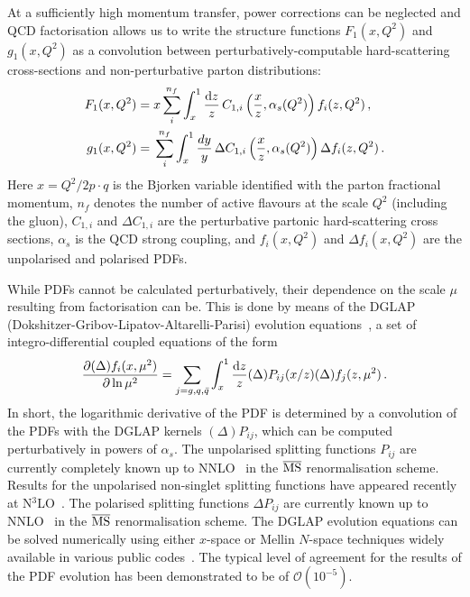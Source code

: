 At a sufficiently high momentum transfer, power corrections can be neglected and
QCD factorisation allows us to write the structure functions 
$F_1(x,Q^2)$ and $g_1(x,Q^2)$ as a convolution between perturbatively-computable
hard-scattering cross-sections and non-perturbative parton distributions:
\begin{align}
F_1(x,Q^2) 
= {} 
& x\sum_i^{n_f} \int_x^1 \frac{{\rm d}z}{z}\,C_{1,i}\left(\frac{x}{z},\alpha_s(Q^2)\right)f_i(z,Q^2) \,, \label{eq:Fi}\\
g_1(x,Q^2) 
= {} 
& \sum_i^{n_f} \int_x^1\frac{dy}{y}\, \Delta C_{1,i}\left(\frac{x}{z},\alpha_s(Q^2)\right) \Delta f_i(z,Q^2) \,.
\label{pdf}
\end{align}
%
Here $x=Q^2/2p\cdot q$ is the Bjorken variable identified with the parton
fractional momentum, $n_f$ denotes the number of active
flavours at the scale $Q^2$ (including the gluon), $C_{1,i}$ and 
$\Delta C_{1,i}$ are the perturbative partonic hard-scattering cross sections,
$\alpha_s$ is the QCD strong coupling, and $f_i(x,Q^2)$ and $\Delta f_i(x,Q^2)$ 
are the unpolarised and polarised PDFs.

While PDFs cannot be calculated perturbatively, their dependence on the scale 
$\mu$ resulting from factorisation can be.
%
This is done by means of the
DGLAP (Dokshitzer-Gribov-Lipatov-Altarelli-Parisi) 
evolution equations~\cite{Dokshitzer:1977sg,Gribov:1972ri,Altarelli:1977zs},
a set of integro-differential coupled equations of the form
\begin{equation}
  \label{eq:dglap}
\frac{\partial (\Delta)f_i(x,\mu^2)}{\partial \ln \mu^2}
=
\sum_{j=g,q,\bar{q}}\int_x^1 
\frac{{\rm d}z}{z}(\Delta)P_{ij}(x/z)(\Delta)f_j(z,\mu^2)\, .
\end{equation}
%
In short, the logarithmic derivative of the PDF is determined by a convolution
of the PDFs with the DGLAP kernels $(\Delta)P_{ij}$, which can be 
computed perturbatively in powers of $\alpha_{s}$.
%
The unpolarised splitting functions $P_{ij}$ are currently completely known up  
to NNLO~\cite{mvvns,Vogt:2004mw} in the $\overline{\rm MS}$ 
renormalisation scheme.
%
Results for the unpolarised non-singlet splitting functions have appeared 
recently at N$^3$LO~\cite{Davies:2016jie,Moch:2017uml}.
%
The polarised splitting functions $\Delta P_{ij}$ are currently known up to  
NNLO~\cite{Moch:2014sna} in the $\overline{\rm MS}$ renormalisation scheme.
%
The DGLAP evolution equations can be solved numerically using
either $x$-space or Mellin $N$-space techniques widely available in various
public codes~\cite{Vogt:2004ns,Salam:2008qg,Botje:2010ay,
Bertone:2013vaa,Bertone:2015cwa}.
%
The typical level of agreement for the results of the PDF evolution 
has been demonstrated to be of $\mathcal{O}(10^{-5})$.

